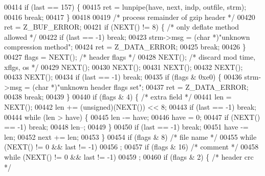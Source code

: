 \begin{DoxyCode}
00414         \textcolor{keywordflow}{if} (last == 157) \{
00415             ret = lunpipe(have, next, indp, outfile, strm);
00416             \textcolor{keywordflow}{break};
00417         \}
00418 
00419         \textcolor{comment}{/* process remainder of gzip header */}
00420         ret = Z\_BUF\_ERROR;
00421         \textcolor{keywordflow}{if} (NEXT() != 8) \{                  \textcolor{comment}{/* only deflate method allowed */}
00422             \textcolor{keywordflow}{if} (last == -1) \textcolor{keywordflow}{break};
00423             strm->msg = (\textcolor{keywordtype}{char} *)\textcolor{stringliteral}{"unknown compression method"};
00424             ret = Z\_DATA\_ERROR;
00425             \textcolor{keywordflow}{break};
00426         \}
00427         flags = NEXT();                     \textcolor{comment}{/* header flags */}
00428         NEXT();                             \textcolor{comment}{/* discard mod time, xflgs, os */}
00429         NEXT();
00430         NEXT();
00431         NEXT();
00432         NEXT();
00433         NEXT();
00434         \textcolor{keywordflow}{if} (last == -1) \textcolor{keywordflow}{break};
00435         \textcolor{keywordflow}{if} (flags & 0xe0) \{
00436             strm->msg = (\textcolor{keywordtype}{char} *)\textcolor{stringliteral}{"unknown header flags set"};
00437             ret = Z\_DATA\_ERROR;
00438             \textcolor{keywordflow}{break};
00439         \}
00440         \textcolor{keywordflow}{if} (flags & 4) \{                    \textcolor{comment}{/* extra field */}
00441             len = NEXT();
00442             len += (unsigned)(NEXT()) << 8;
00443             \textcolor{keywordflow}{if} (last == -1) \textcolor{keywordflow}{break};
00444             \textcolor{keywordflow}{while} (len > have) \{
00445                 len -= have;
00446                 have = 0;
00447                 \textcolor{keywordflow}{if} (NEXT() == -1) \textcolor{keywordflow}{break};
00448                 len--;
00449             \}
00450             \textcolor{keywordflow}{if} (last == -1) \textcolor{keywordflow}{break};
00451             have -= len;
00452             next += len;
00453         \}
00454         \textcolor{keywordflow}{if} (flags & 8)                      \textcolor{comment}{/* file name */}
00455             \textcolor{keywordflow}{while} (NEXT() != 0 && last != -1)
00456                 ;
00457         \textcolor{keywordflow}{if} (flags & 16)                     \textcolor{comment}{/* comment */}
00458             \textcolor{keywordflow}{while} (NEXT() != 0 && last != -1)
00459                 ;
00460         \textcolor{keywordflow}{if} (flags & 2) \{                    \textcolor{comment}{/* header crc */}

\end{DoxyCode}
